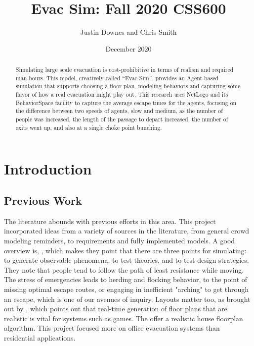 \documentclass[12pt,letterpaper]{article}
\begin{document}
\title{Evac Sim: Fall 2020 CSS600 }

\author{Justin Downes and Chris Smith}
\date{December 2020}
\maketitle

\begin{abstract}
Simulating large scale evacuation is cost-prohibitive in terms of realism and
required man-hours. This model, creatively called ``Evac Sim'', provides an
Agent-based simulation that supports choosing a floor plan,
modeling behaviors and capturing some flavor of how a real evacuation
might play out. This research uses NetLogo and its BehaviorSpace facility to capture the
average escape times for the agents, focusing on the difference between two
speeds of agents, slow and medium, as  the number of people was increased, the
length of the passage to depart increased, the number of exits went up, and also
at a single choke point bunching.
\end{abstract}
\section {Introduction}


%
 
\subsection{Previous Work}
The literature abounds with previous efforts in this area. This project incorporated ideas from a variety of sources in the literature, from general crowd modeling reminders, to requirements and fully implemented models. A good overview is, \cite{almeidaCrowdSimulationModeling2013}, which makes they point that there are three points for simulating: to generate observable phenomena, to test theories, and to test design strategies. They note that people tend to follow the path of least resistance while moving. The stress of emergencies leads to herding and flocking behavior, to the point of missing optimal escape routes, or engaging in inefficient "arching" to get through an escape, which is one of our avenues of inquiry. Layouts matter too, as brought out by \cite{mirahmadiNovelAlgorithmRealtime2012}, which points out that real-time generation of floor plans that are realistic is vital for systems such as  games. The offer a realistic house floorplan algorithm. This project focused more on office evacuation systems than residential applications.
\end{document}
